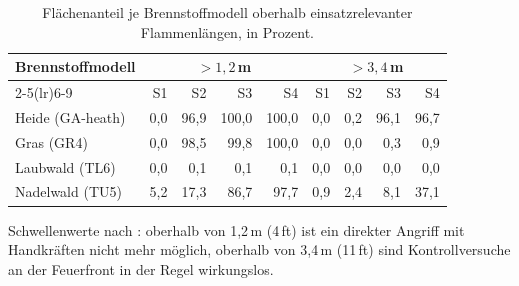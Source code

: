\begin{table}[htbp]
  \centering
  \caption{Flächenanteil je Brennstoffmodell oberhalb einsatzrelevanter Flammenlängen, in Prozent.}
  \label{tab:schwellen}
  \begin{tabular}{lrrrrrrrr}
    \toprule
    Brennstoffmodell & \multicolumn{4}{c}{$>1{,}2$\,m} & \multicolumn{4}{c}{$>3{,}4$\,m} \\
    \cmidrule(lr){2-5}\cmidrule(lr){6-9}
     & S1 & S2 & S3 & S4 & S1 & S2 & S3 & S4 \\
    \midrule
    Heide (GA-heath) & 0{,}0 & 96{,}9 & 100{,}0 & 100{,}0 & 0{,}0 & 0{,}2 & 96{,}1 & 96{,}7 \\
    Gras (GR4) & 0{,}0 & 98{,}5 & 99{,}8 & 100{,}0 & 0{,}0 & 0{,}0 & 0{,}3 & 0{,}9 \\
    Laubwald (TL6) & 0{,}0 & 0{,}1 & 0{,}1 & 0{,}1 & 0{,}0 & 0{,}0 & 0{,}0 & 0{,}0 \\
    Nadelwald (TU5) & 5{,}2 & 17{,}3 & 86{,}7 & 97{,}7 & 0{,}9 & 2{,}4 & 8{,}1 & 37{,}1 \\
    \bottomrule
  \end{tabular}
  \par\smallskip\footnotesize Schwellenwerte nach \textcite{andrewsrothermel1982}: oberhalb von 1{,}2\,m (4\,ft) ist ein direkter Angriff mit Handkräften nicht mehr möglich, oberhalb von 3{,}4\,m (11\,ft) sind Kontrollversuche an der Feuerfront in der Regel wirkungslos.
\end{table}
